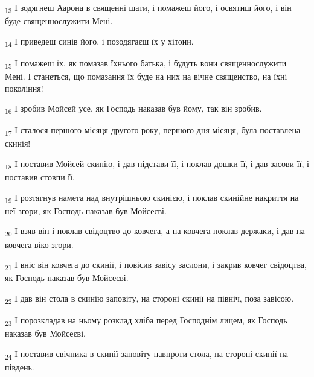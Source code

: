 \begin{tcolorbox}
\textsubscript{13} І зодягнеш Аарона в священні шати, і помажеш його, і освятиш його, і він буде священнослужити Мені.
\end{tcolorbox}
\begin{tcolorbox}
\textsubscript{14} І приведеш синів його, і позодягаєш їх у хітони.
\end{tcolorbox}
\begin{tcolorbox}
\textsubscript{15} І помажеш їх, як помазав їхнього батька, і будуть вони священнослужити Мені. І станеться, що помазання їх буде на них на вічне священство, на їхні покоління!
\end{tcolorbox}
\begin{tcolorbox}
\textsubscript{16} І зробив Мойсей усе, як Господь наказав був йому, так він зробив.
\end{tcolorbox}
\begin{tcolorbox}
\textsubscript{17} І сталося першого місяця другого року, першого дня місяця, була поставлена скинія!
\end{tcolorbox}
\begin{tcolorbox}
\textsubscript{18} І поставив Мойсей скинію, і дав підстави її, і поклав дошки її, і дав засови її, і поставив стовпи її.
\end{tcolorbox}
\begin{tcolorbox}
\textsubscript{19} І розтягнув намета над внутрішньою скинією, і поклав скинійне накриття на неї згори, як Господь наказав був Мойсеєві.
\end{tcolorbox}
\begin{tcolorbox}
\textsubscript{20} І взяв він і поклав свідоцтво до ковчега, а на ковчега поклав держаки, і дав на ковчега віко згори.
\end{tcolorbox}
\begin{tcolorbox}
\textsubscript{21} І вніс він ковчега до скинії, і повісив завісу заслони, і закрив ковчег свідоцтва, як Господь наказав був Мойсеєві.
\end{tcolorbox}
\begin{tcolorbox}
\textsubscript{22} І дав він стола в скинію заповіту, на стороні скинії на північ, поза завісою.
\end{tcolorbox}
\begin{tcolorbox}
\textsubscript{23} І порозкладав на ньому розклад хліба перед Господнім лицем, як Господь наказав був Мойсеєві.
\end{tcolorbox}
\begin{tcolorbox}
\textsubscript{24} І поставив свічника в скинії заповіту навпроти стола, на стороні скинії на південь.
\end{tcolorbox}
